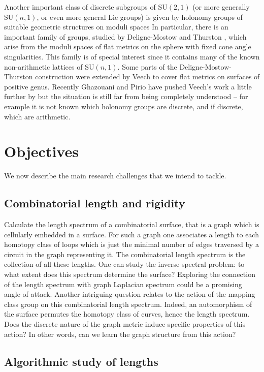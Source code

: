 \documentclass[14pt,fleqn]{article}
\begin{document}
Another important class of discrete subgroups of $\mathrm{SU}(2,1)$ (or more
generally $\mathrm{SU}(n,1)$, 
or even more general Lie groups) is given by
holonomy groups of suitable geometric structures on moduli spaces 
In particular,
there is an important family of groups,
studied by Deligne-Mostow \cite{delignemostow}   and Thurston \cite{thurstonshapes},
which arise from
the moduli spaces of flat metrics on the sphere with fixed cone angle singularities.
This family is of special interest 
since it contains many of the 
known non-arithmetic lattices of $\mathrm{SU}(n,1)$.
Some parts of the  Deligne-Mostow-Thurston construction 
were extended by 
Veech \cite{veech}  to cover flat metrics on surfaces of positive genus.
Recently Ghazouani and Pirio \cite{ghazouanipirio}
have  pushed Veech's work a little further by 
but
the situation is still far from being completely understood -- for example it is not known which
holonomy groups are discrete, and if discrete, which are arithmetic.




\section{Objectives}
We now describe the main research challenges that we intend to tackle. 


\subsection{Combinatorial length and rigidity}
 Calculate the length
spectrum of a combinatorial surface, that is a graph which is
cellularly embedded in a surface.  For such a graph one associates a
length to each homotopy class of loops which is just the minimal
number of edges traversed by a circuit in the graph representing
it. The combinatorial length spectrum is the collection of all these
lengths. One can study the inverse spectral problem: to what extent
does this spectrum determine the surface? Exploring the connection of the length spectrum with graph Laplacian spectrum could be a promising angle of attack. Another intriguing question relates to the action of the mapping class group on this combinatorial length spectrum. Indeed, an automorphism of the
 surface permutes the homotopy class of curves, hence the length spectrum. Does the discrete nature of the graph metric induce specific properties of this action? In other words, can we learn the graph structure from this action?

\subsection{Algorithmic study of lengths}
\end{document}
